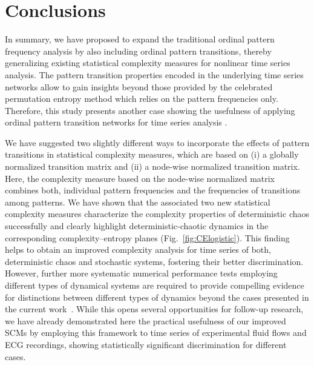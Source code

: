 \documentclass[aip,cha,reprint,nofootinbib]{revtex4-1}
\begin{document}
\section{Conclusions} \label{sec:con}
In summary, we have proposed to expand the traditional ordinal pattern frequency analysis by also including ordinal pattern transitions, thereby generalizing existing statistical complexity measures for nonlinear time series analysis. The pattern transition properties encoded in the underlying time series networks allow to gain insights beyond those provided by the celebrated permutation entropy method which relies on the pattern frequencies only. Therefore, this study presents another case showing the usefulness of applying ordinal pattern transition networks for time series analysis \cite{ZouPR2018}. 

We have suggested two slightly different ways to incorporate the effects of pattern transitions in statistical complexity measures, which are based on (i) a globally normalized transition matrix and (ii) a node-wise normalized transition matrix. Here, the complexity measure based on the node-wise normalized matrix combines both, individual pattern frequencies and the frequencies of transitions among patterns. We have shown that the associated two new statistical complexity measures characterize the complexity properties of deterministic chaos successfully and clearly highlight deterministic-chaotic dynamics in the corresponding complexity--entropy planes (Fig.~\ref{fig:CElogistic}). This finding helps to obtain an improved complexity analysis for time series of both, deterministic chaos and stochastic systems, fostering their better discrimination. However, further more systematic numerical performance tests employing different types of dynamical systems are required to provide compelling evidence for distinctions between different types of dynamics beyond the cases presented in the current work~\cite{BorgesAMC2019,RossoPRE2007}. While this opens several opportunities for follow-up research, we have already demonstrated here the practical usefulness of our improved SCMs by employing this framework to time series of experimental fluid flows and ECG recordings, showing {\color{red} statistically significant discrimination} for different cases. 
\end{document}
